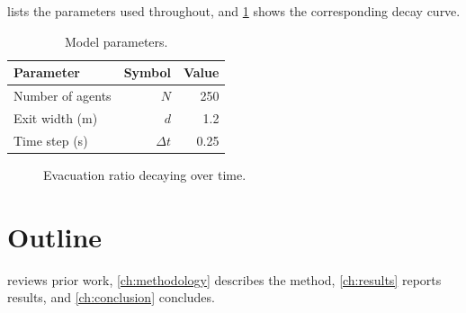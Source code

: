  lists the parameters used throughout, and
\cref{fig:decay} shows the corresponding decay curve.

\begin{table}[htbp]
  \centering
  \caption{Model parameters.}
  \label{tab:params}
  \begin{tabular}{lrr}
    \toprule
    Parameter & Symbol & Value \\
    \midrule
    Number of agents & $N$ & 250 \\
    Exit width (m)   & $d$ & 1.2 \\
    Time step (s)    & $\Delta t$ & 0.25 \\
    \bottomrule
  \end{tabular}
\end{table}

\begin{figure}[htbp]
  \centering
  \caption{Evacuation ratio decaying over time.}
  \label{fig:decay}
\end{figure}

\section{Outline}

 reviews prior work, \cref{ch:methodology} describes
the method, \cref{ch:results} reports results, and \cref{ch:conclusion}
concludes.
